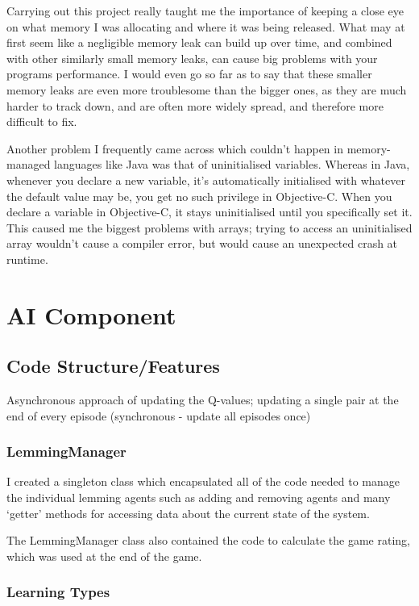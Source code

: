 \documentclass[a4paper,oneside]{report}
\begin{document}
Carrying out this project really taught me the importance of keeping a close eye on what memory I was allocating and where it was being released. What may at first seem like a negligible memory leak can build up over time, and combined with other similarly small memory leaks, can cause big problems with your programs performance. I would even go so far as to say that these smaller memory leaks are even more troublesome than the bigger ones, as they are much harder to track down, and are often more widely spread, and therefore more difficult to fix.

Another problem I frequently came across which couldn't happen in memory-managed languages like Java was that of uninitialised variables. Whereas in Java, whenever you declare a new variable, it's automatically initialised with whatever the default value may be, you get no such privilege in Objective-C. When you declare a variable in Objective-C, it stays uninitialised until you specifically set it. This caused me the biggest problems with arrays; trying to access an uninitialised array wouldn't cause a compiler error, but would cause an unexpected crash at runtime.

\chapter{AI Component}

\section{Code Structure/Features}

Asynchronous approach of updating the Q-values; updating a single pair at the end of every episode (synchronous - update all episodes once)

\subsection{LemmingManager} 

I created a singleton class which encapsulated all of the code needed to manage the individual lemming agents such as adding and removing agents and many `getter' methods for accessing data about the current state of the system.

The LemmingManager class also contained the code to calculate the game rating, which was used at the end of the game.

\subsection{Learning Types}
\end{document}
